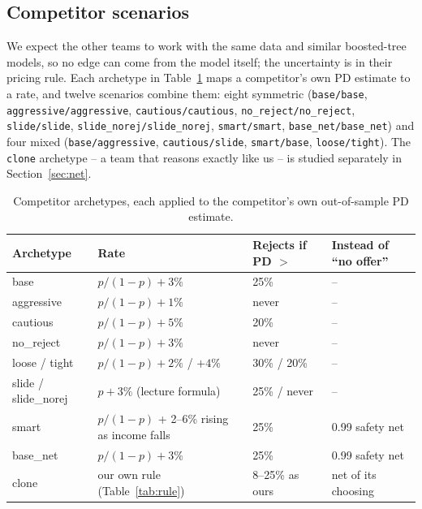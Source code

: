 \documentclass[11pt,a4paper]{article}
\newcommand{\code}[1]{\texttt{#1}}
\begin{document}
\subsection{Competitor scenarios}
We expect the other teams to work with the same data and similar boosted-tree models, so no edge can come from the
model itself; the uncertainty is in their pricing rule. Each archetype in Table~\ref{tab:archetypes} maps a
competitor's own PD estimate to a rate, and twelve scenarios combine them: eight symmetric
(\code{base/base}, \code{aggressive/aggressive}, \code{cautious/cautious}, \code{no\_reject/no\_reject},
\code{slide/slide}, \code{slide\_norej/slide\_norej}, \code{smart/smart}, \code{base\_net/base\_net}) and four mixed
(\code{base/aggressive}, \code{cautious/slide}, \code{smart/base}, \code{loose/tight}). The \code{clone}
archetype -- a team that reasons exactly like us -- is studied separately in Section~\ref{sec:net}.

\begin{table}[h]\centering\small
\begin{tabular}{llll}
\toprule
Archetype & Rate & Rejects if PD $>$ & Instead of ``no offer''\\
\midrule
base        & $p/(1-p) + 3\%$ & 25\% & --\\
aggressive  & $p/(1-p) + 1\%$ & never & --\\
cautious    & $p/(1-p) + 5\%$ & 20\% & --\\
no\_reject  & $p/(1-p) + 3\%$ & never & --\\
loose / tight & $p/(1-p) + 2\%$ / $+4\%$ & 30\% / 20\% & --\\
slide / slide\_norej & $p + 3\%$ (lecture formula) & 25\% / never & --\\
smart       & $p/(1-p)$ + 2--6\% rising as income falls & 25\% & 0.99 safety net\\
base\_net   & $p/(1-p) + 3\%$ & 25\% & 0.99 safety net\\
clone       & our own rule (Table~\ref{tab:rule}) & 8--25\% as ours & net of its choosing\\
\bottomrule
\end{tabular}
\caption{Competitor archetypes, each applied to the competitor's own out-of-sample PD estimate.}
\label{tab:archetypes}
\end{table}
\end{document}
